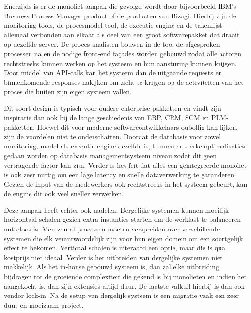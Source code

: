 Enerzijds is er de monoliet aanpak die gevolgd wordt door bijvoorbeeld IBM’s Business Process Manager product of de producten van Bizagi. Hierbij zijn de monitoring tools, de procesmodel tool, de executie engine en de takenlijst allemaal verbonden aan elkaar als deel van een groot softwarepakket dat draait op dezelfde server. De proces analisten bouwen in de tool de afgesproken processen na en de nodige front-end façades worden gebouwd zodat alle actoren rechtstreeks kunnen werken op het systeem en hun aansturing kunnen krijgen. Door middel van API-calls kan het systeem dan de uitgaande requests en binnenkomende responses nakijken om zicht te krijgen op de activiteiten van het proces die buiten zijn eigen systeem vallen. \newline

Dit soort design is typisch voor oudere enterprise pakketten en vindt zijn inspiratie dan ook bij de lange geschiedenis van ERP, CRM, SCM en PLM-pakketten. Hoewel dit voor moderne softwareontwikkelaars oubollig kan lijken, zijn de voordelen niet te onderschatten. Doordat de databasis voor zowel monitoring, model als executie engine dezelfde is, kunnen er sterke optimalisaties gedaan worden op databasis managementsysteem niveau zodat dit geen vertragende factor kan zijn. Verder is het feit dat alles een geïntegreerde monoliet is ook zeer nuttig om een lage latency en snelle dataverwerking te garanderen. Gezien de input van de medewerkers ook rechtstreeks in het systeem gebeurt, kan de engine dit ook veel sneller verwerken. \newline

Deze aanpak heeft echter ook nadelen. Dergelijke systemen kunnen moeilijk horizontaal schalen gezien extra instanties starten om de werklast te balanceren nutteloos is. Men zou al processen moeten verspreiden over verschillende systemen die elk verantwoordelijk zijn voor hun eigen domein om een soortgelijk effect te bekomen. Verticaal schalen is uiteraard een optie, maar die is qua kostprijs niet ideaal. Verder is het uitbreiden van dergelijke systemen niet makkelijk. Als het in-house gebouwd systeem is, dan zal elke uitbreiding bijdragen tot de groeiende complexiteit die gekend is bij monolieten en indien het aangekocht is, dan zijn extensies altijd duur. De laatste valkuil hierbij is dan ook vendor lock-in. Na de setup van dergelijk systeem is een migratie vaak een zeer duur en moeizaam project. \autocite[p. 348]{Dumas2018} \newline

